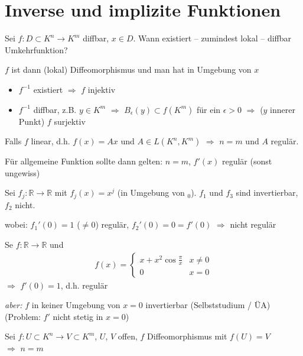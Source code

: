 \section{Inverse und implizite Funktionen}\setcounter{equation}{0}
\begin{underlinedenvironment}[Frage 1]
	Sei $f:D\subset K^n\to K^m$ \gls{diffbar}, $x\in D$. Wann existiert -- zumindest lokal -- \gls{diffbar} Umkehrfunktion?
\end{underlinedenvironment}

\begin{underlinedenvironment}[Vorbetrachtung]
	$f$ ist dann (lokal) Diffeomorphismus und man hat in Umgebung von $x$ \begin{itemize}
		\item $f^{-1}$ existiert $\Rightarrow$ $f$ injektiv
		\item $f^{-1}$ \gls{diffbar}, z.B. $y\in K^m$ $\Rightarrow$ $B_{\epsilon}(y)\subset f(K^m)$ für ein $\epsilon > 0$ $\Rightarrow$ ($y$ innerer Punkt) $f$ surjektiv
	\end{itemize}

	Falls $f$ linear, d.h. $f(x) = Ax$ und $A\in L(K^n, K^m)$ $\Rightarrow$ $n=m$ und $A$ regulär.
	
	Für allgemeine Funktion sollte dann gelten: $n=m$, $f'(x)$ regulär (sonst ungewiss)
\end{underlinedenvironment}

\begin{example}
	Sei $f_j:\mathbb{R}\to\mathbb{R}$ mit $f_j(x) = x^j$ (in Umgebung von $_0$). $f_1$ und $f_3$ sind invertierbar, $f_2$ nicht.
	
	wobei: $f_1'(0)=1$ ($\neq 0$) regulär, $f_2'(0) = 0 = f'(0)$ $\Rightarrow$ nicht regulär
\end{example}

\begin{example}
	Se $f:\mathbb{R}\to\mathbb{R}$ und \begin{align*}
		f(x) = \begin{cases}
			x + x^2\cos \frac{\pi}{x} & x\neq 0 \\ 0 & x=0
		\end{cases}
	\end{align*}
	$\Rightarrow$ $f'(0) = 1$, d.h. regulär
	
	\emph{aber:} $f$ in keiner Umgebung von $x=0$ invertierbar (Selbststudium / ÜA) (Problem: $f'$ nicht stetig in $x=0$)
\end{example}

\begin{lemma}
	Sei $f:U\subset K^n\to V\subset K^m$, $U$, $V$ offen, $f$ Diffeomorphismus mit $f(U) = V$\\
	$\Rightarrow$ $n = m$
\end{lemma}

